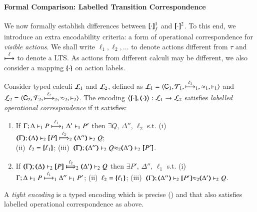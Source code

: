 \documentclass[runningheads]{llncs}
\begin{document}
{\paragraph{Formal Comparison: Labelled Transition Correspondence}
We now formally establish differences between $\map{\cdot}_f^1$ and $\pmap{\cdot}{2}$.
To this end, 
we introduce an extra encodability criteria: a form of operational correspondence 
for \emph{visible actions}. 
We shall write $\ell_1, \ell_2, \ldots$ to denote  
actions different from $\tau$
and  $\hby{\ell}$ to denote a LTS.
As actions from different calculi may be different, we also consider a mapping $\mapa{\cdot}$
on action labels. 

\begin{definition}%
\label{def:lopco}
       Consider typed calculi $\tyl{L}_1$ and  $\tyl{L}_2$, defined as 
        $\tyl{L}_1=\calc{\CAL_1}{{\cal{T}}_1}{\hby{{\ell_1}}_1}{\wb_1}{\proves_1}$
       and $\tyl{L}_2=\calc{\CAL_2}{{\cal{T}}_2}{\hby{{\ell_2}}_2}{\wb_2}{\proves_2}$.
The encoding $\enco{\map{\cdot}, \mapt{\cdot}}: \tyl{L}_1 \to \tyl{L}_2$ satisfies
\emph{labelled operational correspondence}
if it satisfies:
	\begin{enumerate}[1.]
			\item
					If		$\stytraargi{\Gamma}{\ell_1}{\Delta}{P}{\Delta'}{P'}{1}{1}$
					then	$\exists Q$, $\Delta''$, $\ell_2$ s.t. 
							(i)~$\wtytraargi{\mapt{\Gamma}}{\ell_2}{\mapt{\Delta}}{\map{P}}{\mapt{\Delta''}}{Q}{2}{2}$;  \\
							(ii)~$\ell_2 = \mapa{\ell_1}$; 
							(iii)~${\mapt{\Gamma}};{\mapt{\Delta''}}\proves_2 {Q}{\wb_2}{\mapt{\Delta'}}\proves_2 {\map{P'}}$.
				
			\item
					If		$\wtytraargi{\mapt{\Gamma}}{\ell_2}{\mapt{\Delta}}{\map{P}}{\mapt{\Delta'}}{Q}{2}{2}$
					then	$\exists P'$, $\Delta''$, $\ell_1$ s.t. 
							(i)~$\stytraargi{\Gamma}{\ell_1}{\Delta}{P}{\Delta''}{P'}{1}{1}$;
							(ii)~$\ell_2 = \mapa{\ell_1}$;
							(iii)~${\mapt{\Gamma}};{\mapt{\Delta''}}\proves_2 {\map{P'}}{\wb_2}{\mapt{\Delta'}}\proves_2 {Q}$.
	\end{enumerate}
A \emph{tight encoding} is a typed 
encoding 
which is precise () and that also satisfies 
labelled operational correspondence as above.
\end{definition}

}
\end{document}
